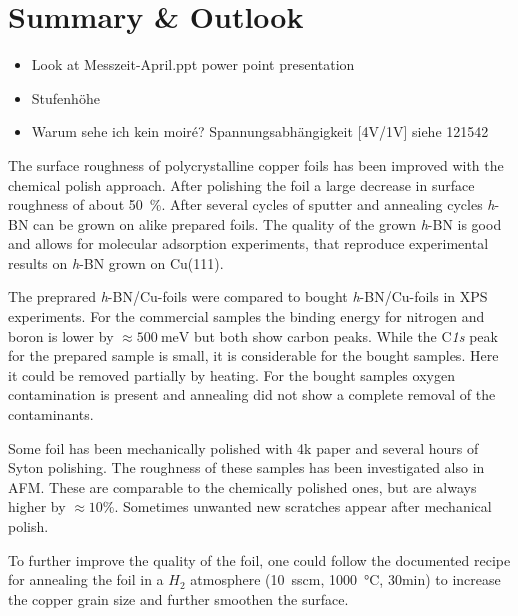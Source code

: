 \section{Summary \& Outlook}
  \begin{itemize}
	\item Look at Messzeit-April.ppt power point presentation
	\item Stufenh\"ohe
	\item Warum sehe ich kein moir\'e? Spannungsabhängigkeit [4V/1V] siehe 121542
\end{itemize}

The surface roughness of polycrystalline copper foils has been improved with the chemical polish approach. After polishing the foil a large decrease in surface roughness of about \SI{50}{\percent}. After several cycles of sputter and annealing cycles \textit{h}-BN can be grown on alike prepared foils. The quality of the grown \textit{h}-BN is good and allows for molecular adsorption experiments, that reproduce experimental results on \textit{h}-BN grown on Cu(111).

The preprared \textit{h}-BN/Cu-foils were compared to bought \textit{h}-BN/Cu-foils in XPS experiments. For the commercial samples the binding energy for nitrogen and boron is lower by $\approx \SI{500}{\milli \eV}$ but both show carbon peaks. While the C\textit{1s} peak for the prepared sample is small, it is considerable for the bought samples. Here it could be removed partially by heating. For the bought samples oxygen contamination is present and annealing did not show a complete removal of the contaminants.

Some foil has been mechanically polished with 4k paper and several hours of Syton polishing. The roughness of these samples has been investigated also in AFM. These are comparable to the chemically polished ones, but are always higher by $\approx 10\%$. Sometimes unwanted new scratches appear after mechanical polish.

To further improve the quality of the foil, one could follow the documented recipe for annealing the foil in a $H_2$ atmosphere (\SI{10}{sscm}, \SI{1000}{\celsius}, 30min)\cite{kim_synthesis_2012} to increase the copper grain size and further smoothen the surface. 